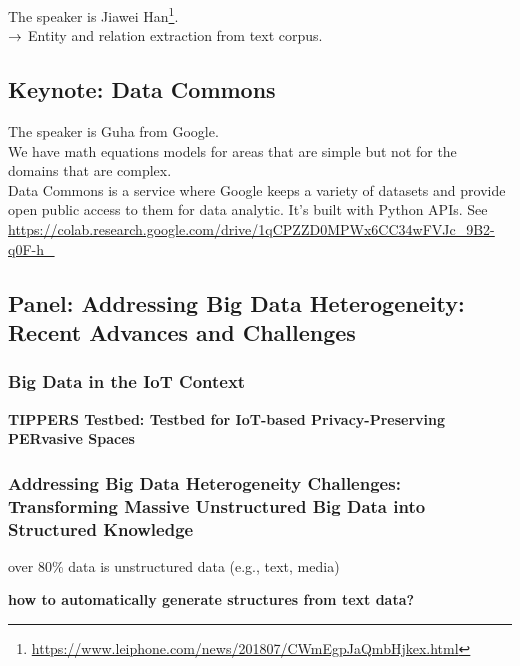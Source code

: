 The speaker is Jiawei Han\footnote{\url{https://www.leiphone.com/news/201807/CWmEgpJaQmbHjkex.html}}.\\

$\rightarrow$ Entity and relation extraction from text corpus. 


\spacerule

\subsection{Keynote: Data Commons}

\label{section:datacommmons}

The speaker is Guha from Google.\\

We have math equations models for areas that are simple but not for the domains that are complex.\\

Data Commons is a service where Google keeps a variety of datasets and provide open public access to them for data analytic. It's built with Python APIs. See \url{https://colab.research.google.com/drive/1qCPZZD0MPWx6CC34wFVJc_9B2-q0F-h_}\\




\spacerule

\subsection{Panel: Addressing Big Data Heterogeneity: Recent Advances and Challenges}

\subsubsection{Big Data in the IoT Context}

{\bf TIPPERS Testbed: Testbed for IoT-based Privacy-Preserving PERvasive Spaces}

\subsubsection{Addressing Big Data Heterogeneity Challenges: Transforming Massive Unstructured Big Data into Structured Knowledge}

over 80\% data is unstructured data (e.g., text, media)

{\bf how to automatically generate structures from text data?}


\spacerule